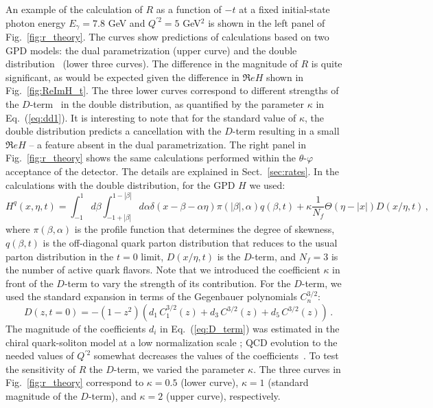 An example of the calculation of $R$ as a function of $-t$ at a fixed
initial-state photon energy $E_{\gamma}=7.8$ GeV and $Q^{\prime 2} = 5$
GeV$^2$ is shown in the left panel of Fig.~\ref{fig:r_theory}.
The curves show predictions of calculations
based on two GPD models: the dual parametrization
\cite{Polyakov:2002wz,Guzey:2006xi,Guzey:2008ys,Polyakov:2008aa} (upper curve)
and the double distribution~\cite{Radyushkin:1998es} (lower three curves).
The difference in the magnitude of $R$ is quite significant, as would be
expected given the difference in $\Re e H$ shown in Fig.~\ref{fig:ReImH_t}.
The three lower curves correspond to different strengths of the
$D$-term~\cite{Goeke:2001tz} in the double distribution, as quantified by the
parameter $\kappa$ in Eq.~(\ref{eq:dd1}).
It is interesting to note that for the standard value of $\kappa$, the double
distribution predicts a cancellation with the $D$-term resulting in a small
$\Re e H$ -- a feature absent in the dual parametrization.
The right panel in Fig.~\ref{fig:r_theory} shows the same calculations
performed within the $\theta$-$\varphi$ acceptance of the detector.
The details are explained in Sect.~\ref{sec:rates}.
In the calculations with the double distribution, for the GPD $H$ we used:
\begin{equation}
H^q(x,\eta,t)=\int^1_{-1} d\beta \int^{1-|\beta|}_{-1+|\beta|} d \alpha \delta(x-\beta-\alpha \eta) \pi(|\beta|,\alpha) q(\beta,t)+ \kappa \frac{1}{N_f}\Theta(\eta-|x|) D(x/\eta,t)
\,,
\label{eq:dd1}
\end{equation}
where $\pi(\beta,\alpha)$ is the profile function that determines the degree
of skewness, $q(\beta,t)$ is the off-diagonal quark parton distribution that
reduces to the usual parton distribution in the $t=0$ limit, $D(x/\eta,t)$ is
the $D$-term, and $N_f=3$ is the number of active quark flavors. Note that we
introduced the coefficient $\kappa$ in front of the $D$-term to vary the
strength of its contribution. For the $D$-term, we used the standard expansion
in terms of the Gegenbauer polynomials $C_n^{3/2}$: 
\begin{equation}
D(z,t=0)=-(1-z^2)(d_1\, C_1^{3/2}(z)+d_3\, C ^{3/2}(z)+d_5\, C ^{3/2}(z)) \,.
\label{eq:D_term}
\end{equation}
The magnitude of the coefficients $d_i$ in Eq.~(\ref{eq:D_term}) was estimated
in the chiral quark-soliton model at a low normalization scale
\cite{Petrov:1998kf}; QCD evolution to the needed values of $Q^{\prime 2}$
somewhat decreases the values of the coefficients~\cite{Diehl:2003ny}.
To test the sensitivity of $R$ the $D$-term, we varied the parameter $\kappa$.
The three curves in Fig.~\ref{fig:r_theory} correspond to $\kappa=0.5$ (lower
curve), $\kappa=1$ (standard magnitude of the $D$-term), and $\kappa=2$
(upper curve), respectively.



